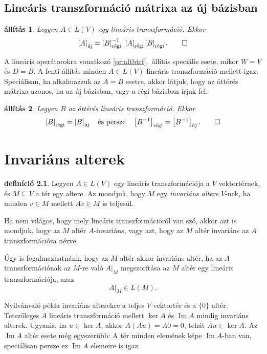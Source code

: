 \documentclass[a4paper, showtrims]{memoir}
\makeatletter
\renewenvironment{proof}[1][\proofname]
    {\par\pushQED{\qed}%
    \normalfont \topsep6\p@\@plus6\p@\relax
    \trivlist
    \item[\hskip\labelsep
        \itshape
    #1\@addpunct{:}]\ignorespaces}
    {\popQED\endtrivlist\@endpefalse}
\theoremstyle{plain}
\newtheorem{proposition}{állítás}[chapter]
\theoremstyle{remark}
\theoremstyle{definition}
\newtheorem{definition}[proposition]{definíció}
\DeclareMathOperator{\im}{Im}
\newcommand{\uj}{\text{új}}
\newcommand{\rgi}{\text{régi}}
\makeatother
\begin{document}
\section{Lineáris transzformáció mátrixa az új bázisban}
\begin{proposition}
	Legyen $A\in L\left( V \right)$ egy lineáris transzformáció.
	Ekkor
	\[
		\left[ A \right]_{\uj}
		=
		\left[ B \right]^{-1}_\rgi\
		\left[ A \right]_\rgi
		\left[ B \right]_\rgi.\qedhere
	\]
\end{proposition}
\begin{proof}
    A lineáris operátorokra vonatkozó \ref{pr:altbtrf}.~állítás speciális esete,
	mikor $W=V$ és $D=B$.
\end{proof}
A fenti állítás minden $A\in L\left( V \right)$ lineáris transzformáció mellett igaz.
Speciálisan, ha alkalmazzuk az $A=B$ esetre, akkor látjuk,
hogy az áttérés mátrixa azonos, ha az új bázisban, vagy a régi bázisban írjuk fel.
\begin{proposition}
	Legyen $B$ az áttérés lineáris transzformáció.
	Ekkor
	\[
		\left[ B \right]_\rgi=\left[ B \right]_\uj
		\quad\text{és persze}\quad
		\left[ B^{-1} \right]_\rgi=\left[ B^{-1} \right]_\uj.\qedhere
	\]
\end{proposition}

\chapter{Invariáns alterek}
\begin{definition}
	Legyen $A\in L\left( V \right)$ egy lineáris transzformációja a $V$ vektortérnek,
	és $M\subseteq V$ a tér egy altere.
	Az mondjuk, hogy $M$ egy \emph{invariáns altere}
	$V$-nek, ha minden $v\in M$ mellett $Av\in M$ is teljesül.
\end{definition}
Ha nem világos, hogy mely lineáris transzformációról van szó,
akkor azt is mondjuk, hogy az $M$ altér $A$-invariáns, vagy azt,
hogy az $M$ altér invariáns az $A$ transzformációra nézve.

Úgy is fogalmazhatnánk, hogy az $M$ altér akkor invariáns altér,
ha az $A$ transzformációnak az $M$-re való $A|_M$ megszorítása az $M$
altér egy lineáris transzformációja, azaz
\[
	A|_M\in L\left( M \right).
\]

Nyilvánvaló példa invariáns alterekre a teljes $V$ vektortér és a $\{0\}$ altér.
Tetszőleges $A$ lineáris transzformáció mellett $\ker A$ és $\im A$ mindig invariáns alterek.
Ugyanis, ha $u\in\ker A$, akkor $A\left( Au \right)=A0=0$, tehát $Au\in\ker A$.
Az $\im A$ altér esete még egyszerűbb: A tér minden elemének képe $\im A$-ban van, speciálisan persze ez $\im A$ elemeire is igaz.
\end{document}
